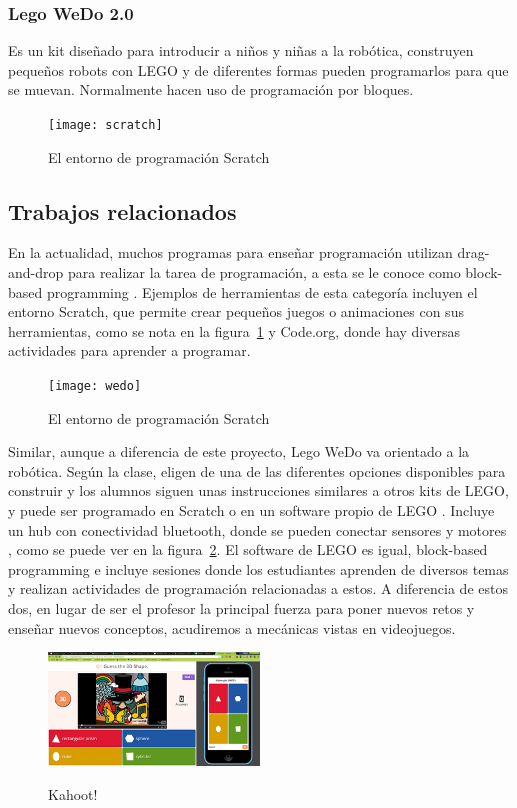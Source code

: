 \subsubsection{Lego WeDo 2.0}
Es un kit diseñado para introducir a niños y niñas a la robótica, 
construyen pequeños robots con LEGO y de diferentes 
formas pueden programarlos para que se muevan. 
Normalmente hacen uso de programación por bloques.

\begin{figure}
    \centering
    \texttt{[image: scratch]}
    \caption{El entorno de programación Scratch}
    \label{fig:scratch_scrn}
\end{figure}

\subsection{Trabajos relacionados}
En la actualidad, muchos programas para enseñar programación utilizan 
drag-and-drop para realizar la tarea de programación, 
a esta se le conoce como block-based programming \cite{block_based_programming}. 
Ejemplos de herramientas de esta categoría incluyen el entorno Scratch, 
que permite crear pequeños juegos o animaciones con sus herramientas, 
como se nota en la figura~\ref{fig:scratch_scrn} y Code.org, donde hay diversas actividades 
para aprender a programar.

\begin{figure}
    \centering
    \texttt{[image: wedo]}
    \label{fig:wedo_kit}
    \caption{El entorno de programación Scratch}
\end{figure}

Similar, aunque a diferencia de este proyecto, Lego WeDo va orientado a la robótica. Según la clase, eligen de una de las diferentes opciones disponibles para construir y los alumnos siguen unas instrucciones similares a otros kits de LEGO, y puede ser programado en Scratch o en un software propio de LEGO \cite{lego_wedo_explanation}. Incluye un hub con conectividad bluetooth, donde se pueden conectar sensores y motores \cite{lego_wedo_site}, como se puede ver en la figura~\ref{fig:wedo_kit}. El software de LEGO es igual, block-based programming e incluye sesiones donde los estudiantes aprenden de diversos temas y realizan actividades de programación relacionadas a estos. A diferencia de estos dos, en lugar de ser el profesor la principal fuerza para poner nuevos retos y enseñar nuevos conceptos, acudiremos a mecánicas vistas en videojuegos.

\begin{figure}
    \centering
    \includegraphics[width=0.5\textwidth]{images/kahoot.png}
    \label{fig:kahoot}
    \caption{Kahoot!}
\end{figure}

